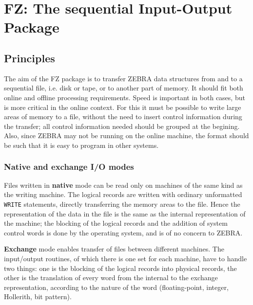 \chapter{FZ: The sequential Input-Output Package}
\section{Principles}
\par The aim of the FZ package
is to transfer ZEBRA data structures from and to a sequential file,
i.e. disk or tape, or to another part of memory.
It should fit both online and offline processing requirements.
Speed is important in both cases,
but is more critical in the online context.
For this it must be possible to write large areas of memory
to a file, without the need to insert control information
during the transfer; all control information needed
should be grouped at the begining.
Also, since ZEBRA may not be running on the online machine,
the format should be such that it is easy to program in other systems.
\subsection{Native and exchange I/O modes}
\par Files written in {\bf native} mode can be read only on machines
of the same kind as the writing machine.
The logical records are written with ordinary unformatted {\tt WRITE}
statements,
directly transferring the memory areas to the file.
Hence the representation of the data in the file is the same as
the internal representation of the machine;
the blocking of the logical records and the addition of
system control words
is done by the operating system,
and is of no concern to ZEBRA.
\par {\bf Exchange} mode enables transfer of files between different
machines. The input/output routines, of which there is
one set for each machine, have to handle two things:
one is the blocking of the logical records into physical records,
the other is the translation of every word from the internal
to the exchange representation,
according to the nature of the word
(floating-point, integer, Hollerith, bit pattern).
